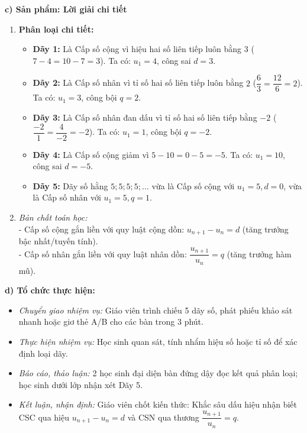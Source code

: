 \documentclass[12pt, a4paper]{article}
\begin{document}
\noindent \textbf{c) Sản phẩm: Lời giải chi tiết}
\begin{enumerate}[leftmargin=0.6cm]
    \item \textbf{Phân loại chi tiết:}
    \begin{itemize}
        \item \textbf{Dãy 1:} Là Cấp số cộng vì hiệu hai số liên tiếp luôn bằng $3$ ($7 - 4 = 10 - 7 = 3$). Ta có: $u_1 = 4$, công sai $d = 3$.
        \item \textbf{Dãy 2:} Là Cấp số nhân vì tỉ số hai số liên tiếp luôn bằng $2$ ($\dfrac{6}{3} = \dfrac{12}{6} = 2$). Ta có: $u_1 = 3$, công bội $q = 2$.
        \item \textbf{Dãy 3:} Là Cấp số nhân đan dấu vì tỉ số hai số liên tiếp bằng $-2$ ($\dfrac{-2}{1} = \dfrac{4}{-2} = -2$). Ta có: $u_1 = 1$, công bội $q = -2$.
        \item \textbf{Dãy 4:} Là Cấp số cộng giảm vì $5 - 10 = 0 - 5 = -5$. Ta có: $u_1 = 10$, công sai $d = -5$.
        \item \textbf{Dãy 5:} Dãy số hằng $5; 5; 5; 5; \dots$ vừa là Cấp số cộng với $u_1 = 5, d = 0$, vừa là Cấp số nhân với $u_1 = 5, q = 1$.
    \end{itemize}
    \item \textit{Bản chất toán học:}\\
    - Cấp số cộng gắn liền với quy luật cộng dồn: $u_{n+1} - u_n = d$ (tăng trưởng bậc nhất/tuyến tính).\\
    - Cấp số nhân gắn liền với quy luật nhân dồn: $\dfrac{u_{n+1}}{u_n} = q$ (tăng trưởng hàm mũ).
\end{enumerate}

\noindent \textbf{d) Tổ chức thực hiện:}
\begin{itemize}[leftmargin=0.8cm]
    \item \textit{Chuyển giao nhiệm vụ:} Giáo viên trình chiếu 5 dãy số, phát phiếu khảo sát nhanh hoặc giơ thẻ A/B cho các bàn trong 3 phút.
    \item \textit{Thực hiện nhiệm vụ:} Học sinh quan sát, tính nhẩm hiệu số hoặc tỉ số để xác định loại dãy.
    \item \textit{Báo cáo, thảo luận:} 2 học sinh đại diện bàn đứng dậy đọc kết quả phân loại; học sinh dưới lớp nhận xét Dãy 5.
    \item \textit{Kết luận, nhận định:} Giáo viên chốt kiến thức: Khắc sâu dấu hiệu nhận biết CSC qua hiệu $u_{n+1} - u_n = d$ và CSN qua thương $\dfrac{u_{n+1}}{u_n} = q$.
\end{itemize}
\end{document}
